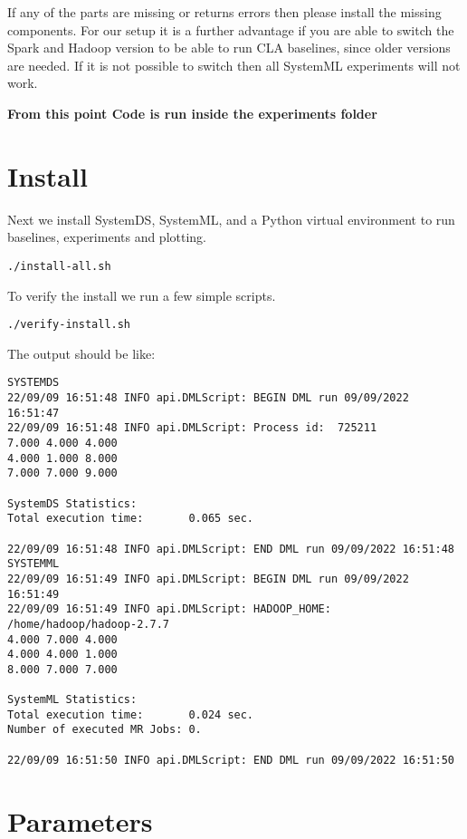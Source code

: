 \documentclass{readme}
\begin{document}
If any of the parts are missing or returns errors then please install the missing components.
For our setup it is a further advantage if you are able to switch the Spark and Hadoop version to
be able to run CLA baselines, since older versions are needed. If it is not possible to switch then all SystemML experiments will not work.

\vspace{1cm}
\noindent
\textbf{From this point Code is run inside the experiments folder}
\vspace{1cm}

\newpage


\section{Install}

Next we install SystemDS, SystemML, and a Python virtual environment to run baselines, experiments and plotting.

\begin{lstlisting}
./install-all.sh
\end{lstlisting}

To verify the install we run a few simple scripts.

\begin{lstlisting}
./verify-install.sh 
\end{lstlisting}

The output should be like:

\begin{lstlisting}
SYSTEMDS
22/09/09 16:51:48 INFO api.DMLScript: BEGIN DML run 09/09/2022 16:51:47
22/09/09 16:51:48 INFO api.DMLScript: Process id:  725211
7.000 4.000 4.000
4.000 1.000 8.000
7.000 7.000 9.000

SystemDS Statistics:
Total execution time:		0.065 sec.

22/09/09 16:51:48 INFO api.DMLScript: END DML run 09/09/2022 16:51:48
SYSTEMML
22/09/09 16:51:49 INFO api.DMLScript: BEGIN DML run 09/09/2022 16:51:49
22/09/09 16:51:49 INFO api.DMLScript: HADOOP_HOME: /home/hadoop/hadoop-2.7.7
4.000 7.000 4.000
4.000 4.000 1.000
8.000 7.000 7.000

SystemML Statistics:
Total execution time:		0.024 sec.
Number of executed MR Jobs:	0.

22/09/09 16:51:50 INFO api.DMLScript: END DML run 09/09/2022 16:51:50    
\end{lstlisting}


\section{Parameters}
\end{document}
